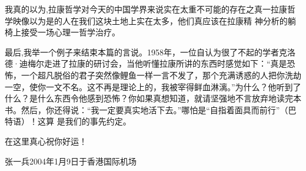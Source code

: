 \documentclass{article}
\begin{document}
我真的以为,拉康哲学对今天的中国学界来说实在太重不可能的存在之真一拉康哲学映像以为是的人在我们这块土地上实在太多，他们真应该在拉康精
神分析的躺椅上接受一场心理一哲学治疗。 

\newpage

最后,我举一个例子来结束本篇的言说。1958年，一位自认为很了不起的学者克洛德·迪梅尔走进了拉康的研讨会，当他听懂拉康所讲的东西时感觉如下：“真是恐怖，一个超凡脱俗的君子突然像鲤鱼一样一言不发了，那个充满诱惑的人把你洗劫一空，使你一文不名。这不再是理论上的，我被宰得鲜血淋漓。”为什么？他听到了什么？是什么东西令他感到恐怖？你如果真想知道，就请坚强地不言放弃地读完本书。然后，你还得说：“我一定要真实地活下去。”哪怕是“自指着面具而前行”（巴特语）！这算
是我们的事先约定。 


在这里真心祝你好运！ 

张一兵2004年1月9日于香港国际机场
\end{document}
